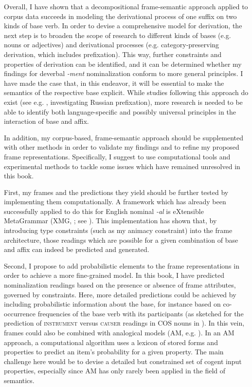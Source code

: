 Overall, I have shown that a decompositional frame-semantic approach applied to corpus data succeeds in modeling the derivational process of one suffix on two kinds of base verb. In order to devise a comprehensive model for derivation, the next step is to broaden the scope of research to different kinds of bases (e.g. nouns or adjectives) and derivational processes (e.g. category-preserving derivation, which includes prefixation). 
This way, further constraints and properties of derivation can be identified, and it can be determined whether my findings for deverbal \textit{-ment} nominalization conform to more general principles.
I have made the case that, in this endeavor, it will be essential to make the semantics of the respective base explicit. While studies following this approach do exist (see e.g. \citealt{Zinova.2016}, investigating Russian prefixation), more research is needed to be able to identify both language-specific and \textendash{} possibly \textendash{} universal principles in the interaction of base and affix. 

In addition, my corpus-based, frame-semantic approach should be sup\-ple\-ment\-ed with other methods in order to validate my findings and to refine my proposed frame representations. Specifically, I suggest to use computational tools and experimental methods to tackle some issues which have remained unresolved in this book. 

First, my frames and the predictions they yield should be further tested by implementing them computationally. A framework which has already been successfully applied to do this for English nominal \textit{-al} is eXtensible MetaGrammar (XMG, \citealt{Crabbe.2013}; see \citealt{Andreou.inpress}). This implementation has shown that, by introducing type constraints (such as my animacy constraint) into the frame architecture, those readings which are possible for a given combination of base and affix can indeed be predicted and generated. 

Second, I propose to add probabilistic elements to the frame representations in order to achieve a more fine-grained model.  
In this book, I have predicted nominalization readings based on the presence or absence of frame attributes, governed by constraints. Here, more detailed predictions could be achieved by including probabilistic information about the base, for instance based on co-occurrence frequencies of the base verb with its participants (as sketched for the prediction of \textsc{instrument} versus \textsc{causer} readings in COS nouns in ).
In this vein, frames could also be combined with analogical models (AM, e.g. \citealt{Skousen.2007}).
In an AM approach, a computational algorithm uses a lexicon of stored forms and properties to predict an item's probability for a given property. The main challenge here would be to devise a detailed but constrained set of cogent input properties, especially since AM has only rarely been applied in the field of semantics. 

